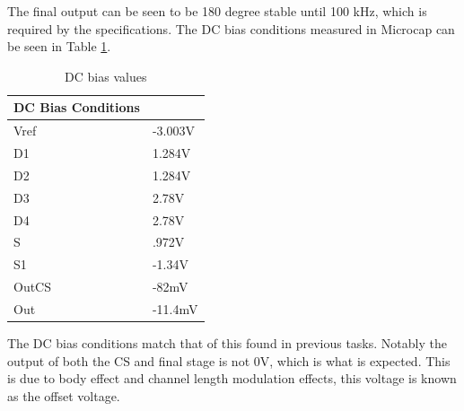 The final output can be seen to be 180 degree stable until 100 kHz, which is required by the specifications.
The DC bias conditions measured in Microcap can be seen in Table \ref{tab:simdcbias}.


\begin{table}[H]
	\centering
	\caption{DC bias values}
	\label{tab:simdcbias}
	\begin{tabular}{|l|l|}
		\hline
		\textbf{DC Bias Conditions} &         \\ \hline
		Vref                        & -3.003V \\ \hline
		D1                          & 1.284V  \\ \hline
		D2                          & 1.284V  \\ \hline
		D3                          & 2.78V   \\ \hline
		D4                          & 2.78V   \\ \hline
		S                           & .972V   \\ \hline
		S1                          & -1.34V  \\ \hline
		OutCS                       & -82mV   \\ \hline
		Out                         & -11.4mV \\ \hline
	\end{tabular}
\end{table}

The DC bias conditions match that of this found in previous tasks. Notably the output of both the CS  and final stage is not 0V, which is what is expected. This is due to body effect and channel length modulation effects, this voltage is known as the offset voltage.



